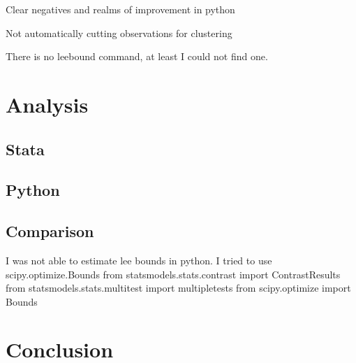 \documentclass[10pt]{article}
\begin{document}
Clear negatives and realms of improvement in python

Not automatically cutting observations for clustering 


There is no leebound command, at least I could not find one. 


\section{Analysis}

\subsection{Stata}


\subsection{Python}


\subsection{Comparison}

I was not able to estimate lee bounds in python. I tried to use scipy.optimize.Bounds
from statsmodels.stats.contrast import ContrastResults
from statsmodels.stats.multitest import multipletests
from scipy.optimize import Bounds

\section{Conclusion}
\end{document}
